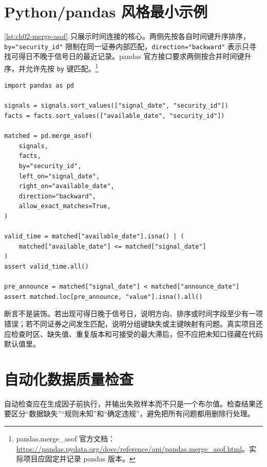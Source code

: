 \section{Python/pandas 风格最小示例}

\cref{lst:ch02-merge-asof} 只展示时间连接的核心。两侧先按各自时间键升序排序，\texttt{by="security\_id"} 限制在同一证券内部匹配，\texttt{direction="backward"} 表示只寻找可得日不晚于信号日的最近记录。pandas 官方接口要求两侧按合并时间键升序，并允许先按 \texttt{by} 键匹配。\footnote{pandas.merge\_asof 官方文档：\url{https://pandas.pydata.org/docs/reference/api/pandas.merge_asof.html}。实际项目应固定并记录 pandas 版本。}

\begin{lstlisting}[caption={按证券进行向后点时匹配的最小示例},label={lst:ch02-merge-asof}]
import pandas as pd

signals = signals.sort_values(["signal_date", "security_id"])
facts = facts.sort_values(["available_date", "security_id"])

matched = pd.merge_asof(
    signals,
    facts,
    by="security_id",
    left_on="signal_date",
    right_on="available_date",
    direction="backward",
    allow_exact_matches=True,
)

valid_time = matched["available_date"].isna() | (
    matched["available_date"] <= matched["signal_date"]
)
assert valid_time.all()

pre_announce = matched["signal_date"] < matched["announce_date"]
assert matched.loc[pre_announce, "value"].isna().all()
\end{lstlisting}

断言不是装饰。若出现可得日晚于信号日，说明方向、排序或时间字段至少有一项错误；若不同证券之间发生匹配，说明分组键缺失或主键映射有问题。真实项目还应检查时区、缺失值、重复版本和可接受的最大滞后，但不应把未知口径藏在代码默认值里。

\section{自动化数据质量检查}

自动检查应在生成因子前执行，并输出失败样本而不只是一个布尔值。检查结果还要区分“数据缺失”“规则未知”和“确定违规”，避免把所有问题都用删除行处理。

